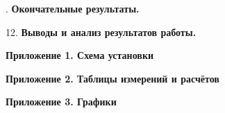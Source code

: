 \documentclass[12pt]{article}
\begin{document}
    \mediumvspace

    . \textbf{Окончательные результаты.}

    

    \mediumvspace

    \noindent

    \newpage
    
    12. \textbf{Выводы и анализ результатов работы.}

    

    \clearpage

    \begin{center}
        \LARGE
        \textbf{Приложение 1. Схема установки}
    \end{center}

    \mediumvspace

    

    \clearpage

    \begin{center}
        \LARGE
        \textbf{Приложение 2. Таблицы измерений и расчётов}
    \end{center}

    \mediumvspace

    

    

    

    \clearpage

    \begin{center}
        \LARGE
        \textbf{Приложение 3. Графики}
    \end{center}

    \mediumvspace

    
\end{document}
